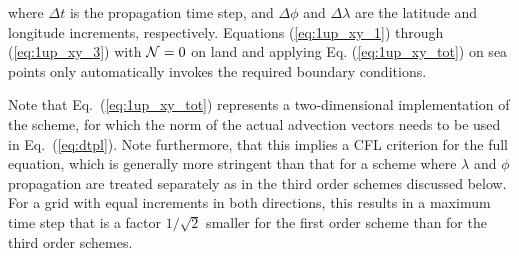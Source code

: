 \noindent
where $\Delta t$ is the propagation time step, and $\Delta \phi$ and $\Delta
\lambda$ are the latitude and longitude increments, respectively. Equations
(\ref{eq:1up_xy_1}) through (\ref{eq:1up_xy_3}) with ${\cal N}=0$ on land and
applying Eq. (\ref{eq:1up_xy_tot}) on sea points only automatically invokes
the required boundary conditions.

Note that Eq.~(\ref{eq:1up_xy_tot}) represents a two-dimensional
implementation of the scheme, for which the norm of the actual advection
vectors needs to be used in Eq.~(\ref{eq:dtpl}). Note furthermore, that this
implies a CFL criterion for the full equation, which is generally more
stringent than that for a scheme where $\lambda$ and $\phi$ propagation are
treated separately as in the third order schemes discussed below. For a grid
with equal increments in both directions, this results in a maximum time step
that is a factor $1/\sqrt{2}$ smaller for the first order scheme than for the
third order schemes.